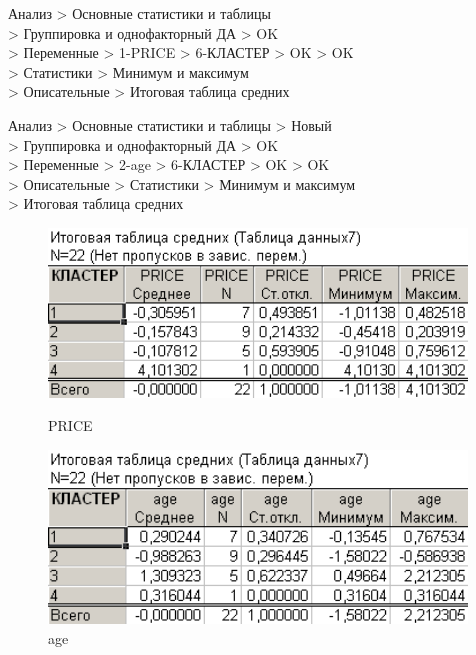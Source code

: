Анализ > Основные статистики и таблицы\\
> Группировка и однофакторный ДА > OK\\
> Переменные > 1-PRICE > 6-КЛАСТЕР > OK > OK\\
> Статистики > Минимум и максимум\\
> Описательные > Итоговая таблица средних

Анализ > Основные статистики и таблицы > Новый\\
> Группировка и однофакторный ДА > OK\\
> Переменные > 2-age > 6-КЛАСТЕР > OK > OK\\
> Описательные > Статистики > Минимум и максимум\\
> Итоговая таблица средних

\begin{figure}[!h]
  \centering
  \begin{minipage}{0.49\textwidth}
    \centering

    \includegraphics[width=0.99\textwidth]
    {inc/cars_my/3.5.PNG}

    \caption{PRICE}
    \label{fig:3_5}
  \end{minipage}
  \begin{minipage}{0.49\textwidth}
    \centering

    \includegraphics[width=0.99\textwidth]
    {inc/cars_my/3.6.PNG}

    \caption{age}
    \label{fig:3_6}
  \end{minipage}
\end{figure}


